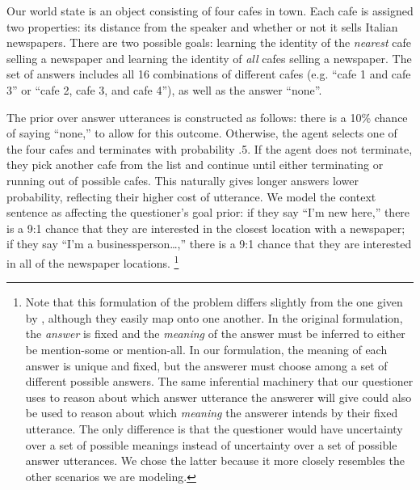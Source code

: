 \documentclass[12pt, floatsintext, jou]{apa6}
\begin{document}
Our world state is an object consisting of four cafes in town. Each cafe is assigned two properties: its distance from the speaker and whether or not it sells Italian newspapers. There are two possible goals: learning the identity of the \emph{nearest} cafe selling a newspaper and learning the identity of \emph{all} cafes selling a newspaper. The set of answers includes all 16 combinations of different cafes (e.g. ``cafe 1 and cafe 3'' or ``cafe 2, cafe 3, and cafe 4''), as well as the answer ``none''. 

The prior over answer utterances is constructed as follows: there is a 10\% chance of saying ``none,'' to allow for this outcome. Otherwise, the agent selects one of the four cafes and terminates with probability .5. If the agent does not terminate, they pick another cafe from the list and continue until either terminating or running out of possible cafes.  This naturally gives longer answers lower probability, reflecting their higher cost of utterance. We model the context sentence as affecting the questioner's goal prior: if they say ``I'm new here,'' there is a 9:1 chance that they are interested in the closest location with a newspaper; if they say ``I'm a businessperson\dots,'' there is a 9:1 chance that they are interested in all of the newspaper locations. 
\footnote{Note that this formulation of the problem differs slightly from the one given by , although they easily map onto one another. In the original formulation, the \emph{answer} is fixed and the \emph{meaning} of the answer must be inferred to either be mention-some or mention-all. In our formulation, the meaning of each answer is unique and fixed, but the answerer must choose among a set of different possible answers. The same inferential machinery that our questioner uses to reason about which answer utterance the answerer will give could also be used to reason about which \emph{meaning} the answerer intends by their fixed utterance. The only difference is that the questioner would have uncertainty over a set of possible meanings instead of uncertainty over a set of possible answer utterances. We chose the latter because it more closely resembles the other scenarios we are modeling.}
\end{document}
